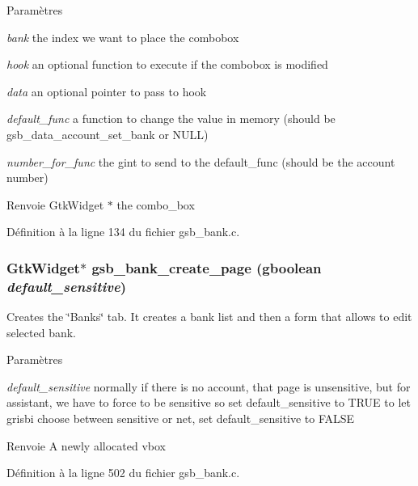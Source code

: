 \begin{DoxyParams}{Paramètres}
\item[{\em bank}]the index we want to place the combobox \item[{\em hook}]an optional function to execute if the combobox is modified \item[{\em data}]an optional pointer to pass to hook \item[{\em default\_\-func}]a function to change the value in memory (should be gsb\_\-data\_\-account\_\-set\_\-bank or NULL) \item[{\em number\_\-for\_\-func}]the gint to send to the default\_\-func (should be the account number)\end{DoxyParams}
\begin{DoxyReturn}{Renvoie}
GtkWidget $\ast$ the combo\_\-box 
\end{DoxyReturn}


Définition à la ligne 134 du fichier gsb\_\-bank.c.

\subsubsection[{gsb\_\-bank\_\-create\_\-page}]{\setlength{\rightskip}{0pt plus 5cm}GtkWidget$\ast$ gsb\_\-bank\_\-create\_\-page (gboolean {\em default\_\-sensitive})}\label{gsb__bank_8c_aef019dce3bfc8b3570e7bb6f8d356da1}
Creates the \char`\"{}Banks\char`\"{} tab. It creates a bank list and then a form that allows to edit selected bank.


\begin{DoxyParams}{Paramètres}
\item[{\em default\_\-sensitive}]normally if there is no account, that page is unsensitive, but for assistant, we have to force to be sensitive so set default\_\-sensitive to TRUE to let grisbi choose between sensitive or net, set default\_\-sensitive to FALSE \end{DoxyParams}
\begin{DoxyReturn}{Renvoie}
A newly allocated vbox 
\end{DoxyReturn}


Définition à la ligne 502 du fichier gsb\_\-bank.c.

